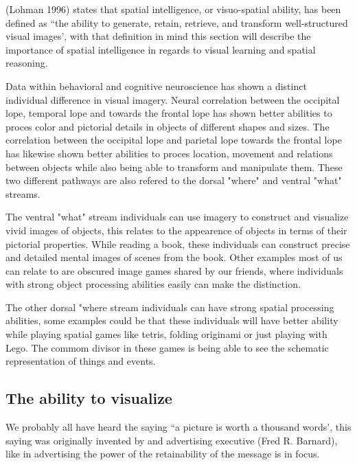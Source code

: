 (Lohman 1996) states that spatial intelligence, or visuo-spatial ability, has been defined as ``the ability to generate, retain, retrieve, and transform well-structured visual images'\cite[p97]{tapsfield1996}, with that definition in mind this section will describe the importance of spatial intelligence in regards to visual learning and spatial reasoning.


Data within behavioral and cognitive neuroscience has shown a distinct individual difference in visual imagery. Neural correlation between the occipital lope, temporal lope and towards the frontal lope has shown better abilities to proces color and pictorial details in objects of different shapes and sizes. The correlation between the occipital lope and parietal lope towards the frontal lope has likewise shown better abilities to proces location, movement and relations between objects while also being able to transform and manipulate them.
These two different pathways are also refered to the dorsal "where" and ventral "what" streams.

The ventral "what" stream individuals can use imagery to construct and visualize vivid images of objects, this relates to the appearence of objects in terms of their pictorial properties. While reading a book, these individuals can construct precise and detailed mental images of scenes from the book. Other examples most of us can relate to are obscured image games shared by our friends, where individuals with strong object processing abilities easily can make the distinction.

The other dorsal "where stream individuals can have strong spatial processing abilities, some examples could be that these individuals will have better ability while playing spatial games like tetris, folding originami or just playing with Lego. The commom divisor in these games is being able to see the schematic representation of things and events.

\subsection{The ability to visualize}\label{sec:the_ability_to_visualize}
We probably all have heard the saying ``a picture is worth a thousand words', this saying was originally invented by and advertising executive (Fred R. Barnard)\cite*{phrases2022}, like in advertising the power of the retainability of the message is in focus. 

